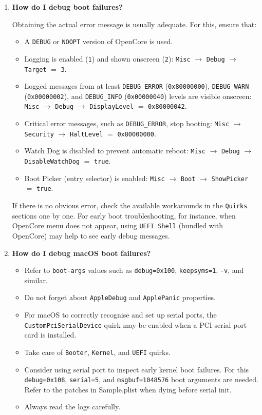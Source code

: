 \documentclass[]{article}
\providecommand{\tightlist}{%
  \setlength{\itemsep}{0pt}\setlength{\parskip}{0pt}}
\begin{document}
\begin{enumerate}
\item
  \textbf{How do I debug boot failures?}

  Obtaining the actual error message is usually adequate. For this, ensure that:
  \begin{itemize}
  \tightlist
  \item A \texttt{DEBUG} or \texttt{NOOPT} version of OpenCore is used.
  \item Logging is enabled (\texttt{1}) and shown onscreen (\texttt{2}):
  \texttt{Misc} $\rightarrow$ \texttt{Debug} $\rightarrow$ \texttt{Target}
  $=$ \texttt{3}.
  \item Logged messages from at least \texttt{DEBUG\_ERROR}
  (\texttt{0x80000000}), \texttt{DEBUG\_WARN} (\texttt{0x00000002}), and
  \texttt{DEBUG\_INFO} (\texttt{0x00000040}) levels are visible onscreen:
  \texttt{Misc} $\rightarrow$ \texttt{Debug} $\rightarrow$ \texttt{DisplayLevel}
  $=$ \texttt{0x80000042}.
  \item Critical error messages, such as \texttt{DEBUG\_ERROR}, stop booting:
  \texttt{Misc} $\rightarrow$ \texttt{Security}
  $\rightarrow$ \texttt{HaltLevel} $=$ \texttt{0x80000000}.
  \item Watch Dog is disabled to prevent automatic reboot:
  \texttt{Misc} $\rightarrow$ \texttt{Debug} $\rightarrow$
  \texttt{DisableWatchDog} $=$ \texttt{true}.
  \item Boot Picker (entry selector) is enabled: \texttt{Misc}
  $\rightarrow$ \texttt{Boot} $\rightarrow$ \texttt{ShowPicker} $=$ \texttt{true}.
  \end{itemize}

  If there is no obvious error, check the available workarounds in the \texttt{Quirks} sections
  one by one. For early boot troubleshooting, for instance, when OpenCore menu does not appear,
  using \texttt{UEFI Shell} (bundled with OpenCore) may help to see
  early debug messages.

\item
  \textbf{How do I debug macOS boot failures?}

  \begin{itemize}
  \tightlist
  \item Refer to \texttt{boot-args} values such as \texttt{debug=0x100}, \texttt{keepsyms=1},
    \texttt{-v}, and similar.
  \item Do not forget about \texttt{AppleDebug} and \texttt{ApplePanic} properties.
  \item For macOS to correctly recognise and set up serial ports, the \texttt{CustomPciSerialDevice} quirk
    may be enabled when a PCI serial port card is installed.
  \item Take care of \texttt{Booter}, \texttt{Kernel}, and \texttt{UEFI} quirks.
  \item Consider using serial port to inspect early kernel boot failures. For this
    \texttt{debug=0x108}, \texttt{serial=5}, and \texttt{msgbuf=1048576} boot arguments are needed.
    Refer to the patches in Sample.plist when dying before serial init.
  \item Always read the logs carefully.
  \end{itemize}


\end{enumerate}
\end{document}
